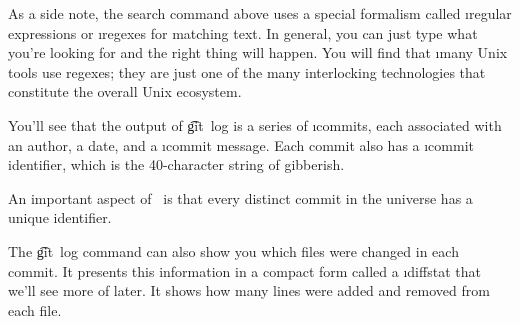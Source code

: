 \documentclass[letterpaper,12pt,titlepage,twoside]{article}
\begin{document}
As a side note, the search command above uses a special formalism called
\i{regular expressions} or \i{regexes} for matching text. In general, you can
just type what you're looking for and the right thing will happen. You will
find that \i{many} Unix tools use regexes; they are just one of the many
interlocking technologies that constitute the overall Unix ecosystem.


You'll see that the output of \t{git~log} is a series of \i{commits}, each
associated with an author, a date, and a \i{commit message}. Each commit also
has a \i{commit identifier}, which is the 40-character string of gibberish.


An important aspect of \git\ is that every distinct commit in the universe has
a unique identifier.


The \t{git~log} command can also show you which files were changed in each
commit. It presents this information in a compact form called a \i{diffstat}
that we'll see more of later. It shows how many lines were added and removed
from each file.


\end{document}
